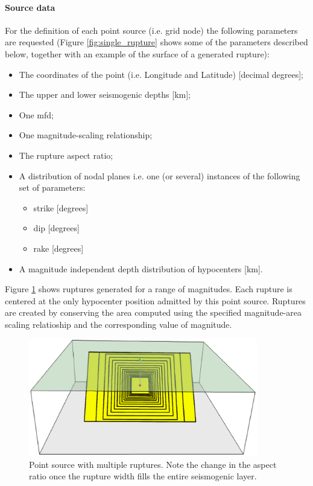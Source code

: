 \paragraph{Source data}
%
For the definition of each point source (i.e. grid node) the following 
parameters are requested (Figure \ref{fig:single_rupture} shows some of 
the parameters described below, together with an example of the 
surface of a generated rupture):
\begin{itemize}
\item The coordinates of the point (i.e. Longitude and Latitude) [decimal 
    degrees];
\item The upper and lower seismogenic depths [km];
\item One \gls{mfd};
\item One magnitude-scaling relationship;
\item The rupture aspect ratio;
\item A distribution of nodal planes i.e. one (or several) instances 
    of the following set of parameters:
\begin{itemize}
    \item \gls{strike} [degrees]
    \item \gls{dip} [degrees]
    \item \gls{rake} [degrees]
\end{itemize}
\item A magnitude independent depth distribution of hypocenters [km]. 
\end{itemize}
%
Figure \ref{fig:point_source_multiple_ruptures} shows ruptures 
generated for a range of magnitudes. Each rupture is centered at the 
only hypocenter position admitted by this point source. 
Ruptures are created by conserving the area computed
using the specified mag\-ni\-tude-area scaling relatioship and the
corresponding value of magnitude.
\begin{figure}[ht!]
\centering
\includegraphics[width=10cm]{./figures/hazard/point_source_multiple_ruptures.ps}
\caption{Point source with multiple ruptures. Note the change in the aspect 
ratio once the rupture width fills the entire seismogenic layer.}
\label{fig:point_source_multiple_ruptures}
\end{figure}

